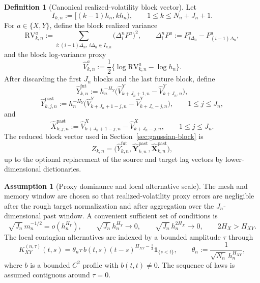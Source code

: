 \documentclass[11pt,a4paper]{amsart}
\theoremstyle{plain}
\theoremstyle{definition}
\newtheorem{definition}[theorem]{Definition}
\newtheorem{assumption}[theorem]{Assumption}
\theoremstyle{remark}
\newcommand{\one}{\mathbf{1}}
\begin{document}
\begin{definition}[Canonical realized-volatility block vector]\label{def:primitive-proxies}
Let
\[
        I_{k,n}:=[(k-1)h_n,kh_n),
        \qquad
        1\le k\le N_n+J_n+1.
\]
For \(a\in\{X,Y\}\), define the block realized variance
\[
        \mathrm{RV}_{k,n}^{a}
        :=
        \sum_{i:(i-1)\Delta_n,\ i\Delta_n\in I_{k,n}}
        \bigl(\Delta_i^nP^a\bigr)^2,
        \qquad
        \Delta_i^nP^a:=P_{i\Delta_n}^a-P_{(i-1)\Delta_n}^a,
\]
and the block log-variance proxy
\[
        \widehat V_{k,n}^{a}
        :=
        \frac12\{\log \mathrm{RV}_{k,n}^{a}-\log h_n\}.
\]
After discarding the first \(J_n\) blocks and the last future block, define
\[
        \widehat Y_{k,n}^{\mathrm{fut}}
        :=
        h_n^{-H_Y}
        \bigl(
        \widehat V_{k+J_n+1,n}^{Y}
        -
        \widehat V_{k+J_n,n}^{Y}
        \bigr),
\]
\[
        \widehat Y_{k,j,n}^{\mathrm{past}}
        :=
        h_n^{-H_Y}
        \bigl(
        \widehat V_{k+J_n+1-j,n}^{Y}
        -
        \widehat V_{k+J_n-j,n}^{Y}
        \bigr),
        \qquad
        1\le j\le J_n,
\]
and
\[
        \widehat X_{k,j,n}^{\mathrm{past}}
        :=
        \widehat V_{k+J_n+1-j,n}^{X}
        -
        \widehat V_{k+J_n-j,n}^{X},
        \qquad
        1\le j\le J_n.
\]
The reduced block vector used in Section~\ref{sec:gaussian-block} is
\[
        Z_{k,n}
        =
        \bigl(
        \widehat Y_{k,n}^{\mathrm{fut}},
        \widehat{\mathbf Y}_{k,n}^{\mathrm{past}},
        \widehat{\mathbf X}_{k,n}^{\mathrm{past}}
        \bigr),
\]
up to the optional replacement of the source and target lag vectors by lower-dimensional
dictionaries.
\end{definition}

\begin{assumption}[Proxy dominance and local alternative scale]\label{ass:primitive-proxy-rate}
The mesh and memory window are chosen so that realized-volatility proxy errors are negligible after
the rough target normalization and after aggregation over the \(J_n\)-dimensional past window.  A
convenient sufficient set of conditions is
\[
        \sqrt{J_n}\,m_n^{-1/2}=o(h_n^{H_Y}),
        \qquad
        \sqrt{J_n}\,h_n^{H_Y}\to0,
        \qquad
        \sqrt{J_n}\,h_n^{2H_X}\to0,
        \qquad
        2H_X>H_{XY}.
\]
The local contagion alternatives are indexed by a bounded amplitude \(\tau\) through
\[
        K_{XY}^{(n,\tau)}(t,s)
        =
        \theta_n\tau\,b(t,s)(t-s)^{H_{XY}-\frac12}\one_{\{s<t\}},
        \qquad
        \theta_n:=
        \frac{1}{\sqrt{N_n}\,h_n^{H_{XY}}},
\]
where \(b\) is a bounded \(C^2\) profile with \(b(t,t)\neq0\).  The sequence of laws is assumed
contiguous around \(\tau=0\).
\end{assumption}
\end{document}
